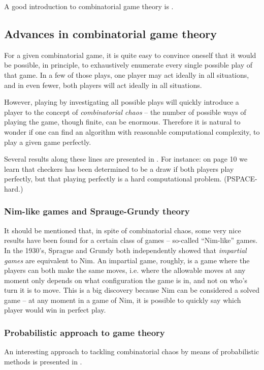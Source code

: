 A good introduction to combinatorial game theory is \citep{winning_ways}.

\subsection{Advances in combinatorial game theory}

For a given combinatorial game, it is quite easy to convince oneself that it would be possible, in principle, to exhaustively enumerate every single possible play of that game.
In a few of those plays, one player may act ideally in all situations, and in even fewer, both players will act ideally in all situations.

However, playing by investigating all possible plays will quickly introduce a player to the concept of \emph{combinatorial chaos} -- the number of possible ways of playing the game, though finite, can be enormous.
Therefore it is natural to wonder if one can find an algorithm with reasonable computational complexity, to play a given game perfectly.

Several results along these lines are presented in \citep{demaine_hearn08}. For instance: on page 10 we learn that checkers has been determined to be a draw if both players play perfectly, but that playing perfectly is a hard computational problem. (PSPACE-hard.)

\subsubsection{Nim-like games and Sprauge-Grundy theory}

It should be mentioned that, in spite of combinatorial chaos, some very nice results have been found for a certain class of games -- so-called ``Nim-like'' games.
In the 1930's, Sprague and Grundy both independently showed that \emph{impartial games} are equivalent to Nim.
An impartial game, roughly, is a game where the players can both make the same moves, i.e. where the allowable moves at any moment only depends on what configuration the game is in, and not on who's turn it is to move.
This is a big discovery because Nim can be considered a solved game -- at any moment in a game of Nim, it is possible to quickly say which player would win in perfect play.

\subsubsection{Probabilistic approach to game theory}

An interesting approach to tackling combinatorial chaos by means of probabilistic methods is presented in \citep{beck08}.
